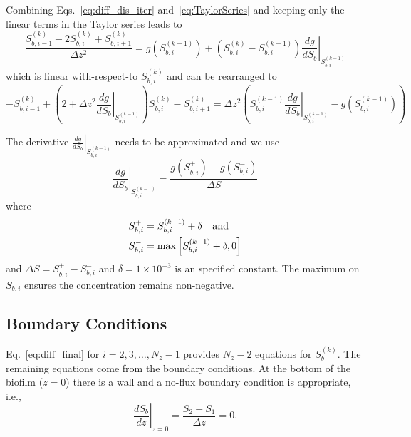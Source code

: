 \documentclass[letterpaper, twoside]{article}
\numberwithin{equation}{section}
\newcommand{\ie}{i.e.}
\begin{document}
Combining Eqs.~\ref{eq:diff_dis_iter} and~\ref{eq:TaylorSeries} and keeping only the linear terms in the Taylor series leads to
\begin{equation} \label{eq:diff_linear}
  \frac{ S_{b,i-1}^{(k)} - 2 S_{b,i}^{(k)} + S_{b,i+1}^{(k)}}{\Delta z^2} =  g\left(S_{b,i}^{(k-1)}\right) + \left( S_{b,i}^{(k)} - S_{b,i}^{(k-1)}\right) \left.\frac{d g}{d S_b}\right|_{S_{b,i}^{(k-1)}} 
\end{equation}
which is linear with-respect-to $S_{b,i}^{(k)}$ and can be rearranged to
\begin{equation}
  \label{eq:diff_final}
  -S_{b,i-1}^{(k)} + \left( 2 +\Delta z^2\left.\frac{d g}{d S_b}\right|_{S_{b,i}^{(k-1)}}\right) S_{b,i}^{(k)} - S_{b,i+1}^{(k)}
  = \Delta z^2\left( S_{b,i}^{(k-1)} \left.\frac{d g}{d S_b}\right|_{S_{b,i}^{(k-1)}} - g\left(S_{b,i}^{(k-1)}\right)\right) 
\end{equation}

The derivative $\left.\frac{d g}{d S_b}\right|_{S_{b,i}^{(k-1)}}$ needs to be approximated and we use
\begin{equation}
  \label{eq:dgds}
  \left.\frac{d g}{d S_b}\right|_{S_{b,i}^{(k-1)}} = \frac{g\left(S_{b,i}^+\right) - g\left(S_{b,i}^{-}\right)}{\Delta S}
\end{equation}
where
\begin{align*}
  S_{b,i}^+&=S_{b,i}^{(k-1)}+\delta \text{\quad and} \\
  S_{b,i}^-&=\max\left[S_{b,i}^{(k-1)}+\delta,0\right]
\end{align*}
and $\Delta S = S_{b,i}^+ - S_{b,i}^-$ and $\delta=1\times 10^{-3}$ is an specified constant.  The maximum on $S_{b,i}^-$ ensures the concentration remains non-negative.

\subsection{Boundary Conditions}
Eq.~\ref{eq:diff_final} for $i=2,3,\dots,N_z-1$ provides $N_z-2$ equations for $S_{b}^{(k)}$.  The remaining equations come from the boundary conditions.  At the bottom of the biofilm ($z=0$) there is a wall and a no-flux boundary condition is appropriate, \ie,
\begin{equation}
  \label{eq:BC1}
  \left.\frac{d S_b}{dz}\right|_{z=0}= \frac{S_2 - S_1}{\Delta z} =0.
\end{equation}
\end{document}
